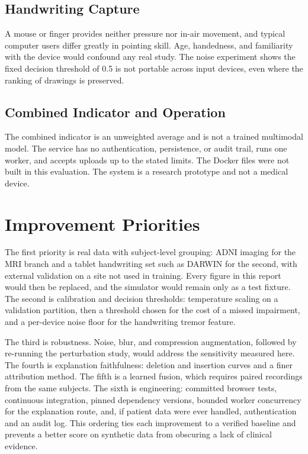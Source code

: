 \documentclass[conference]{IEEEtran}
\begin{document}
\subsection{Handwriting Capture}
A mouse or finger provides neither pressure nor in-air movement, and typical computer users differ greatly in pointing skill. Age, handedness, and familiarity with the device would confound any real study. The noise experiment shows the fixed decision threshold of 0.5 is not portable across input devices, even where the ranking of drawings is preserved.

\subsection{Combined Indicator and Operation}
The combined indicator is an unweighted average and is not a trained multimodal model. The service has no authentication, persistence, or audit trail, runs one worker, and accepts uploads up to the stated limits. The Docker files were not built in this evaluation. The system is a research prototype and not a medical device.

\section{Improvement Priorities}
The first priority is real data with subject-level grouping: ADNI imaging for the MRI branch and a tablet handwriting set such as DARWIN \cite{darwin} for the second, with external validation on a site not used in training. Every figure in this report would then be replaced, and the simulator would remain only as a test fixture. The second is calibration and decision thresholds: temperature scaling \cite{guo} on a validation partition, then a threshold chosen for the cost of a missed impairment, and a per-device noise floor for the handwriting tremor feature.

The third is robustness. Noise, blur, and compression augmentation, followed by re-running the perturbation study, would address the sensitivity measured here. The fourth is explanation faithfulness: deletion and insertion curves and a finer attribution method. The fifth is a learned fusion, which requires paired recordings from the same subjects. The sixth is engineering: committed browser tests, continuous integration, pinned dependency versions, bounded worker concurrency for the explanation route, and, if patient data were ever handled, authentication and an audit log. This ordering ties each improvement to a verified baseline and prevents a better score on synthetic data from obscuring a lack of clinical evidence.
\end{document}
